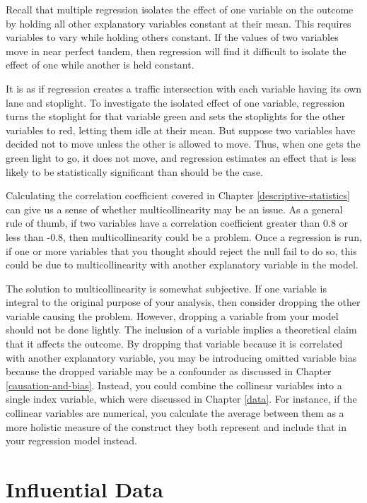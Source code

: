 \documentclass[
]{book}
\begin{document}
Recall that multiple regression isolates the effect of one variable on the outcome by holding all other explanatory variables constant at their mean. This requires variables to vary while holding others constant. If the values of two variables move in near perfect tandem, then regression will find it difficult to isolate the effect of one while another is held constant.

It is as if regression creates a traffic intersection with each variable having its own lane and stoplight. To investigate the isolated effect of one variable, regression turns the stoplight for that variable green and sets the stoplights for the other variables to red, letting them idle at their mean. But suppose two variables have decided not to move unless the other is allowed to move. Thus, when one gets the green light to go, it does not move, and regression estimates an effect that is less likely to be statistically significant than should be the case.

Calculating the correlation coefficient covered in Chapter \ref{descriptive-statistics} can give us a sense of whether multicollinearity may be an issue. As a general rule of thumb, if two variables have a correlation coefficient greater than 0.8 or less than -0.8, then multicollinearity could be a problem. Once a regression is run, if one or more variables that you thought should reject the null fail to do so, this could be due to multicollinearity with another explanatory variable in the model.

The solution to multicollinearity is somewhat subjective. If one variable is integral to the original purpose of your analysis, then consider dropping the other variable causing the problem. However, dropping a variable from your model should not be done lightly. The inclusion of a variable implies a theoretical claim that it affects the outcome. By dropping that variable because it is correlated with another explanatory variable, you may be introducing omitted variable bias because the dropped variable may be a confounder as discussed in Chapter \ref{causation-and-bias}. Instead, you could combine the collinear variables into a single index variable, which were discussed in Chapter \ref{data}. For instance, if the collinear variables are numerical, you calculate the average between them as a more holistic measure of the construct they both represent and include that in your regression model instead.

\hypertarget{influential-data}{%
\section{Influential Data}\label{influential-data}}
\end{document}

